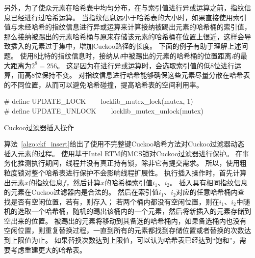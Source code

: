 另外，为了使众元素在哈希表中均匀分布，在与索引值进行异或运算之前，指纹信息已经进行过哈希运算。
当指纹信息远小于哈希表的大小时，如果直接使用索引值与未经哈希的指纹信息进行异或运算来计算接纳被踢出元素的哈希桶的索引值，那么接纳被踢出的元素哈希桶与原来存储该元素的哈希桶在位置上很近，这样会导致插入的元素过于集中，增加Cuckoo路径的长度。
下面的例子有助于理解上述问题。
使用8比特的指纹信息时，接纳从\textit{i}中被踢出的元素的哈希桶的位置距离\textit{i}的最大距离为$2^8 = 256$。
这是因为在进行异或运算时，会选取索引值的低8位进行运算，而高8位保持不变。
对指纹信息进行哈希能够确保这些元素尽量分散在哈希表的不同位置，从而可以避免哈希碰撞，提高哈希表的空间利用率。
\begin{algorithm}[htbp]
\SetAlgoLined
\# define UPDATE\_LOCK ~~~ locklib\_mutex\_lock(mutex, 1)\\
\# define UPDATE\_UNLOCK ~~~ locklib\_mutex\_unlock(mutex)\\
\caption{Cuckoo过滤器插入操作}
\label{algo:ckf_insert}
\end{algorithm}
算法~\ref{algo:ckf_insert}给出了使用不完整键Cuckoo哈希方法对Cuckoo过滤器动态插入元素的过程。
使用基于Intel RTM的MCS锁对Cuckoo过滤器进行保护。
在事务化推测执行期间，线程并没有真正持有锁，除非它有提交需求。
所以，使用粗粒度锁对整个哈希表进行保护不会影响线程扩展性。
执行插入操作时，首先计算出元素$x$的指纹信息$f$，然后计算$x$的哈希桶索引值$i_1$、$i_2$。
插入具有相同指纹信息的元素在Cuckoo过滤器内是合法的。
然后在索引值$i_1$、$i_2$对应的任意哈希桶内查找是否有空闲位置，若有，则存入；
若两个桶内都没有空闲位置，则在$i_1$、$i_2$中随机的选取一个哈希桶，随机的踢出该桶内的一个元素，然后将新插入的元素存储到空出来的位置。
被踢出的元素将移动到其备选的哈希桶内，如果备选桶内也没有空闲位置，则重复替换过程，一直到所有的元素都找到存储位置或者替换的次数达到上限值为止。
如果替换次数达到上限值，可以认为哈希表已经达到“饱和”，需要考虑重建更大的哈希表。

